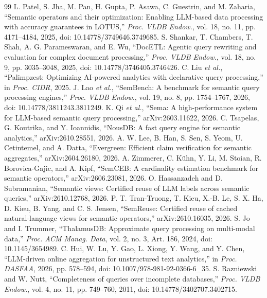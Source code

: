 \documentclass[conference]{IEEEtran}
\begin{document}
\begin{thebibliography}{99}
 L. Patel, S. Jha, M. Pan, H. Gupta, P. Asawa, C. Guestrin, and M. Zaharia, ``Semantic operators and their optimization: Enabling LLM-based data processing with accuracy guarantees in LOTUS,'' \emph{Proc. VLDB Endow.}, vol. 18, no. 11, pp. 4171--4184, 2025, doi: 10.14778/3749646.3749685.
 S. Shankar, T. Chambers, T. Shah, A. G. Parameswaran, and E. Wu, ``DocETL: Agentic query rewriting and evaluation for complex document processing,'' \emph{Proc. VLDB Endow.}, vol. 18, no. 9, pp. 3035--3048, 2025, doi: 10.14778/3746405.3746426.
 C. Liu \emph{et al.}, ``Palimpzest: Optimizing AI-powered analytics with declarative query processing,'' in \emph{Proc. CIDR}, 2025.
 J. Lao \emph{et al.}, ``SemBench: A benchmark for semantic query processing engines,'' \emph{Proc. VLDB Endow.}, vol. 19, no. 8, pp. 1754--1767, 2026, doi: 10.14778/3811243.3811249.
 K. Qi \emph{et al.}, ``Sema: A high-performance system for LLM-based semantic query processing,'' arXiv:2603.11622, 2026.
 C. Tsapelas, G. Koutrika, and Y. Ioannidis, ``NousDB: A fast query engine for semantic analytics,'' arXiv:2610.28551, 2026.
 A. W. Lee, B. Han, S. Sen, S. Yeom, U. Cetintemel, and A. Datta, ``Evergreen: Efficient claim verification for semantic aggregates,'' arXiv:2604.26180, 2026.
 A. Zimmerer, C. K\"uhn, Y. Li, M. Stoian, R. Borovica-Gajic, and A. Kipf, ``SemCEB: A cardinality estimation benchmark for semantic operators,'' arXiv:2606.23081, 2026.
 O. Hassanzadeh and D. Subramanian, ``Semantic views: Certified reuse of LLM labels across semantic queries,'' arXiv:2610.12768, 2026.
 P. T. Tran-Truong, T. Kieu, X.-B. Le, S. X. Ha, D. Kieu, B. Yang, and C. S. Jensen, ``SemReuse: Certified reuse of cached natural-language views for semantic operators,'' arXiv:2610.16035, 2026.
 S. Jo and I. Trummer, ``ThalamusDB: Approximate query processing on multi-modal data,'' \emph{Proc. ACM Manag. Data}, vol. 2, no. 3, Art. 186, 2024, doi: 10.1145/3654989.
 C. Hui, W. Lu, Y. Gao, L. Xiong, Y. Wang, and Y. Chen, ``LLM-driven online aggregation for unstructured text analytics,'' in \emph{Proc. DASFAA}, 2026, pp. 578--594, doi: 10.1007/978-981-92-0366-6\_35.
 S. Razniewski and W. Nutt, ``Completeness of queries over incomplete databases,'' \emph{Proc. VLDB Endow.}, vol. 4, no. 11, pp. 749--760, 2011, doi: 10.14778/3402707.3402715.

\end{thebibliography}
\end{document}
